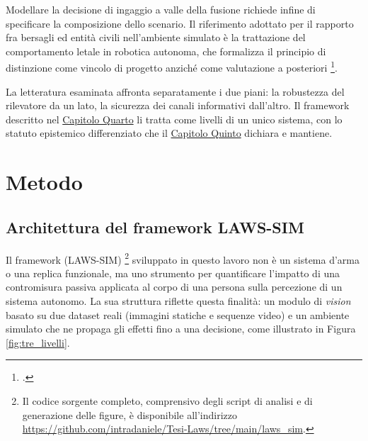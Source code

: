 \documentclass[a4paper,12pt]{report}
\begin{document}
Modellare la decisione di ingaggio a valle della fusione richiede infine di
specificare la composizione dello scenario. Il riferimento adottato per il
rapporto fra bersagli ed entità civili nell'ambiente simulato è la trattazione
del comportamento letale in robotica autonoma, che formalizza il principio di
distinzione come vincolo di progetto anziché come valutazione a posteriori
\footcite{arkin_2009}.

La letteratura esaminata affronta separatamente i due piani: la robustezza del
rilevatore da un lato, la sicurezza dei canali informativi dall'altro. Il
framework descritto nel \hyperref[cap4]{Capitolo Quarto} li tratta come livelli di un unico
sistema, con lo statuto epistemico differenziato che il \hyperref[cap5]{Capitolo Quinto}
dichiara e mantiene.


\chapter{Metodo}
\label{cap4}

\section{Architettura del framework LAWS-SIM}
\label{sec:laws_sim}

Il framework (LAWS-SIM) \footnote{Il codice sorgente completo, comprensivo degli
script di analisi e di generazione delle figure, è disponibile
all'indirizzo \url{https://github.com/intradaniele/Tesi-Laws/tree/main/laws_sim}.}
sviluppato in questo lavoro non è un sistema d'arma o una replica funzionale, ma
uno strumento per quantificare l'impatto di una contromisura passiva applicata al
corpo di una persona sulla percezione di un sistema autonomo. La sua struttura
riflette questa finalità: un modulo di \textit{vision} basato su due dataset
reali (immagini statiche e sequenze video) e un ambiente simulato che ne propaga gli effetti fino a una decisione,
come illustrato in Figura \ref{fig:tre_livelli}.
\end{document}
